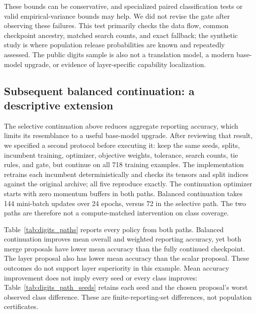 \documentclass[11pt,letterpaper]{article}
\begin{document}
These bounds can be conservative, and specialized paired classification tests or valid empirical-variance bounds may help. We did not revise the gate after observing these failures. This test primarily checks the data flow, common checkpoint ancestry, matched search counts, and exact fallback; the synthetic study is where population release probabilities are known and repeatedly assessed. The public digits sample is also not a translation model, a modern base-model upgrade, or evidence of layer-specific capability localization.

\subsection{Subsequent balanced continuation: a descriptive extension}
The selective continuation above reduces aggregate reporting accuracy, which limits its resemblance to a useful base-model upgrade. After reviewing that result, we specified a second protocol before executing it: keep the same seeds, splits, incumbent training, optimizer, objective weights, tolerance, search counts, tie rules, and gate, but continue on all 718 training examples. The implementation retrains each incumbent deterministically and checks its tensors and split indices against the original archive; all five reproduce exactly. The continuation optimizer starts with zero momentum buffers in both paths. Balanced continuation takes 144 mini-batch updates over 24 epochs, versus 72 in the selective path. The two paths are therefore not a compute-matched intervention on class coverage.

Table~\ref{tab:digits_paths} reports every policy from both paths. Balanced continuation improves mean overall and weighted reporting accuracy, yet both merge proposals have lower mean accuracy than the fully continued checkpoint. The layer proposal also has lower mean accuracy than the scalar proposal. These outcomes do not support layer superiority in this example. Mean accuracy improvement does not imply every seed or every class improves: Table~\ref{tab:digits_path_seeds} retains each seed and the chosen proposal's worst observed class difference. These are finite-reporting-set differences, not population certificates.

\begin{table}[ht]
\centering\footnotesize
\setlength{\tabcolsep}{3pt}

\caption{Both completed digits paths, mean $\pm$ descriptive seed SD. ``Worst slice $\Delta$'' is the per-seed minimum reporting class-accuracy difference from its incumbent, summarized over seeds. All frozen proposals fail; every released model is the incumbent. Balanced continuation was specified after the selective study and reuses its evaluation partitions.}
\label{tab:digits_paths}
\end{table}
\end{document}
